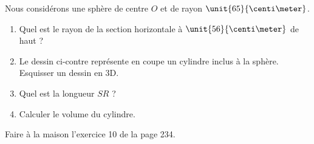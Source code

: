 
\begin{exercice}\label{exosmath-0094}

\begin{wrapfigure}{r}{0.2\textwidth}
    \centering
    \vspace{-0.5cm}

\end{wrapfigure}

    Nous considérons une sphère de centre \( O\) et de rayon \( \unit{65}{\centi\meter}\).
        \begin{enumerate}
            \item
                Quel est le rayon de la section horizontale à \( \unit{56}{\centi\meter}\) de haut ?
            \item
                Le dessin ci-contre représente en coupe un cylindre inclus à la sphère. Esquisser un dessin en 3D.
            \item
                Quel est la longueur \( SR\) ?
            \item
                Calculer le volume du cylindre.
        \end{enumerate}

%

        Faire à la maison l'exercice 10 de la page 234.

\end{exercice}
